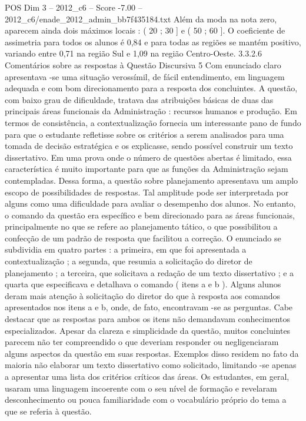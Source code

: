 \begin{textsample}{POS Dim 3 – 2012\_c6 – Score -7.00 – 2012\_c6/enade\_2012\_admin\_bb7f435184.txt}
Além da moda na nota zero, aparecem ainda dois máximos locais : ( 20 ; 30 ] e ( 50 ; 60 ].
O coeficiente de assimetria para todos os alunos é 0,84 e para todas as regiões se mantém positivo, variando entre 0,71 na região Sul e 1,09 na região Centro-Oeste. 3.3.2.6 Comentários sobre as respostas à Questão Discursiva 5 Com enunciado claro apresentava -se uma situação verossímil, de fácil entendimento, em linguagem adequada e com bom direcionamento para a resposta dos concluintes.
A questão, com baixo grau de dificuldade, tratava das atribuições básicas de duas das principais áreas funcionais da Administração : recursos humanos e produção.
Em termos de consistência, a contextualização fornecia um interessante pano de fundo para que o estudante refletisse sobre os critérios a serem analisados para uma tomada de decisão estratégica e os explicasse, sendo possível construir um texto dissertativo.
Em uma prova onde o número de questões abertas é limitado, essa característica é muito importante para que as funções da Administração sejam contempladas.
Dessa forma, a questão sobre planejamento apresentava um amplo escopo de possibilidades de respostas.
Tal amplitude pode ser interpretada por alguns como uma dificuldade para avaliar o desempenho dos alunos.
No entanto, o comando da questão era específico e bem direcionado para as áreas funcionais, principalmente no que se refere ao planejamento tático, o que possibilitou a confecção de um padrão de resposta que facilitou a correção.
O enunciado se subdividia em quatro partes : a primeira, em que foi apresentada a contextualização ; a segunda, que resumia a solicitação do diretor de planejamento ; a terceira, que solicitava a redação de um texto dissertativo ; e a quarta que especificava e detalhava o comando ( itens a e b ).
Alguns alunos deram mais atenção à solicitação do diretor do que à resposta aos comandos apresentados nos itens a e b, onde, de fato, encontravam -se as perguntas.
Cabe destacar que as respostas para ambos os itens não demandavam conhecimentos especializados.
Apesar da clareza e simplicidade da questão, muitos concluintes parecem não ter compreendido o que deveriam responder ou negligenciaram alguns aspectos da questão em suas respostas.
Exemplos disso residem no fato da maioria não elaborar um texto dissertativo como solicitado, limitando -se apenas a apresentar uma lista dos critérios críticos das áreas.
Os estudantes, em geral, usaram uma linguagem incoerente com o seu nível de formação e revelaram desconhecimento ou pouca familiaridade com o vocabulário próprio do tema a que se referia à questão.

\end{textsample}
